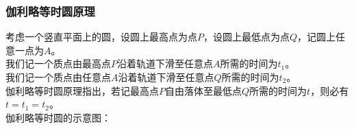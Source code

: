 \documentclass[UTF8]{ctexart}
\begin{document}
\newpage

\subsubsection{伽利略等时圆原理}
    \setcounter{equation}{0}
    考虑一个竖直平面上的圆，设圆上最高点为点$P$，设圆上最低点为点$Q$，记圆上任意一点为$A$。\\[3mm]
    我们记一个质点由最高点$P$沿着轨道下滑至任意点$A$所需的时间为$t_1$。\\[3mm]
    我们记一个质点由任意点$A$沿着轨道下滑至任意点$Q$所需的时间为$t_2$。\\[3mm]
    伽利略等时圆原理指出，若记最高点$P$自由落体至最低点$Q$所需的时间为$t$，则必有$t=t_1=t_2$。\\[3mm]
    伽利略等时圆的示意图：\vspace{-10pt}
\end{document}
